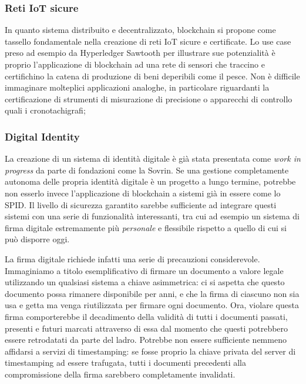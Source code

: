    \subsubsection{Reti IoT sicure}
        	In quanto sistema distribuito e decentralizzato, blockchain si propone come tassello fondamentale nella creazione di reti IoT sicure e certificate. Lo use case preso ad esempio da Hyperledger Sawtooth per illustrare sue potenzialità è proprio l'applicazione di blockchain ad una rete di sensori che traccino e certifichino la catena di produzione di beni deperibili come il pesce. Non è difficile immaginare molteplici applicazioni analoghe, in particolare riguardanti la certificazione di strumenti di misurazione di precisione o apparecchi di controllo quali i cronotachigrafi;
        	
        \subsubsection{Digital Identity}
        	La creazione di un sistema di identità digitale è già stata presentata come \emph{work in progress} da parte di fondazioni come la Sovrin. Se una gestione completamente autonoma delle propria identità digitale è un progetto a lungo termine, potrebbe non esserlo invece l'applicazione di blockchain a sistemi già in essere come lo SPID. Il livello di sicurezza garantito sarebbe sufficiente ad integrare questi sistemi con una serie di funzionalità interessanti, tra cui ad esempio un sistema di firma digitale estremamente più \emph{personale} e flessibile rispetto a quello di cui si può disporre oggi.
        	
        	La firma digitale richiede infatti una serie di precauzioni considerevole. Immaginiamo a titolo esemplificativo di firmare un documento a valore legale utilizzando un qualsiasi sistema a chiave asimmetrica: ci si aspetta che questo documento possa rimanere disponibile per anni, e che la firma di ciascuno non sia usa e getta ma venga riutilizzata per firmare ogni documento. Ora, violare questa firma comporterebbe il decadimento della validità di tutti i documenti passati, presenti e futuri marcati attraverso di essa dal momento che questi potrebbero essere retrodatati da parte del ladro. Potrebbe non essere sufficiente nemmeno affidarsi a servizi di timestamping: se fosse proprio la chiave privata del server di timestamping ad essere trafugata, tutti i documenti precedenti alla compromissione della firma sarebbero completamente invalidati.
        	
